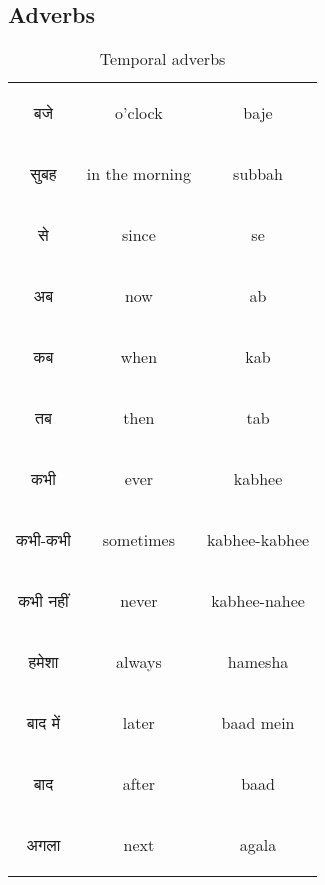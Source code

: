 \newpage
\subsection{Adverbs}

\begin{table}[H]
    \centering
    \begin{tabular}{c|c|c}
\begin{hindi} बजे \end{hindi} & o'clock & baje \\  
\begin{hindi} सुबह \end{hindi} & in the morning & subbah \\  
\begin{hindi} से \end{hindi} & since & se \\  
\begin{hindi} अब \end{hindi} & now & ab \\  
\begin{hindi} कब \end{hindi} & when & kab \\  
\begin{hindi} तब \end{hindi} & then & tab \\  
\begin{hindi} कभी \end{hindi} & ever & kabhee \\  
\begin{hindi} कभी-कभी \end{hindi} & sometimes & kabhee-kabhee \\  
\begin{hindi} कभी नहीं\end{hindi} & never & kabhee-nahee \\  
\begin{hindi} हमेशा\end{hindi} & always & hamesha \\  
\begin{hindi} बाद में\end{hindi} & later & baad mein \\ 
\begin{hindi} बाद \end{hindi} & after & baad \\   
\begin{hindi} अगला \end{hindi} & next & agala \\   
    \end{tabular}
    \caption{Temporal adverbs}
    \label{tab:adverbs_temporal}
\end{table}



